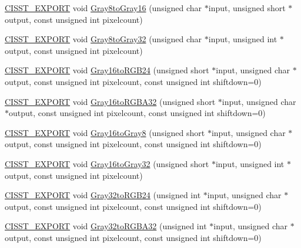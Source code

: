 \begin{DoxyCompactItemize}
\item 
\hyperlink{cmn_export_macros_8h_a99393e0c3ac434b2605235bbe20684f8}{C\-I\-S\-S\-T\-\_\-\-E\-X\-P\-O\-R\-T} void \hyperlink{namespacesvl_converter_a8179b3679c6f8f856a5cf68b9250a5bc}{Gray8to\-Gray16} (unsigned char $\ast$input, unsigned short $\ast$output, const unsigned int pixelcount)
\item 
\hyperlink{cmn_export_macros_8h_a99393e0c3ac434b2605235bbe20684f8}{C\-I\-S\-S\-T\-\_\-\-E\-X\-P\-O\-R\-T} void \hyperlink{namespacesvl_converter_abec323b659f86ba48c507d95725ca0d7}{Gray8to\-Gray32} (unsigned char $\ast$input, unsigned int $\ast$output, const unsigned int pixelcount)
\item 
\hyperlink{cmn_export_macros_8h_a99393e0c3ac434b2605235bbe20684f8}{C\-I\-S\-S\-T\-\_\-\-E\-X\-P\-O\-R\-T} void \hyperlink{namespacesvl_converter_a49ca4a2723e884f1bda2fced5696e7a3}{Gray16to\-R\-G\-B24} (unsigned short $\ast$input, unsigned char $\ast$output, const unsigned int pixelcount, const unsigned int shiftdown=0)
\item 
\hyperlink{cmn_export_macros_8h_a99393e0c3ac434b2605235bbe20684f8}{C\-I\-S\-S\-T\-\_\-\-E\-X\-P\-O\-R\-T} void \hyperlink{namespacesvl_converter_a7e6ba97ccd5bcf36ff38ba60ca259172}{Gray16to\-R\-G\-B\-A32} (unsigned short $\ast$input, unsigned char $\ast$output, const unsigned int pixelcount, const unsigned int shiftdown=0)
\item 
\hyperlink{cmn_export_macros_8h_a99393e0c3ac434b2605235bbe20684f8}{C\-I\-S\-S\-T\-\_\-\-E\-X\-P\-O\-R\-T} void \hyperlink{namespacesvl_converter_a364d33a0a33a01927317032234bae11d}{Gray16to\-Gray8} (unsigned short $\ast$input, unsigned char $\ast$output, const unsigned int pixelcount, const unsigned int shiftdown=0)
\item 
\hyperlink{cmn_export_macros_8h_a99393e0c3ac434b2605235bbe20684f8}{C\-I\-S\-S\-T\-\_\-\-E\-X\-P\-O\-R\-T} void \hyperlink{namespacesvl_converter_a90d96aa37f01587bd37866dab12c6faf}{Gray16to\-Gray32} (unsigned short $\ast$input, unsigned int $\ast$output, const unsigned int pixelcount)
\item 
\hyperlink{cmn_export_macros_8h_a99393e0c3ac434b2605235bbe20684f8}{C\-I\-S\-S\-T\-\_\-\-E\-X\-P\-O\-R\-T} void \hyperlink{namespacesvl_converter_ac6222bc8c15797f692e195de1e94ce3b}{Gray32to\-R\-G\-B24} (unsigned int $\ast$input, unsigned char $\ast$output, const unsigned int pixelcount, const unsigned int shiftdown=0)
\item 
\hyperlink{cmn_export_macros_8h_a99393e0c3ac434b2605235bbe20684f8}{C\-I\-S\-S\-T\-\_\-\-E\-X\-P\-O\-R\-T} void \hyperlink{namespacesvl_converter_aecfb8bb13ca78fb42e807265c7b18dc6}{Gray32to\-R\-G\-B\-A32} (unsigned int $\ast$input, unsigned char $\ast$output, const unsigned int pixelcount, const unsigned int shiftdown=0)

\end{DoxyCompactItemize}
